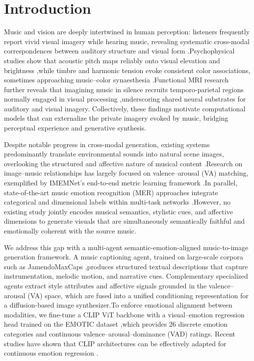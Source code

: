\documentclass[letterpaper]{article}
\begin{document}
\section{Introduction}
Music and vision are deeply intertwined in human perception: listeners frequently report vivid visual imagery while hearing music, revealing systematic cross-modal correspondences between auditory structure and visual form \cite{maimon2020crossmodal}.Psychophysical studies show that acoustic pitch maps reliably onto visual elevation and brightness \cite{takeshima2013changing},while timbre and harmonic tension evoke consistent color associations, sometimes approaching music–color synaesthesia \cite{wallmark2024color}.Functional MRI research further reveals that imagining music in silence recruits temporo-parietal regions normally engaged in visual processing \cite{koelsch2005emotion},underscoring shared neural substrates for auditory and visual imagery. Collectively, these findings motivate computational models that can externalize the private imagery evoked by music, bridging perceptual experience and generative synthesis.

Despite notable progress in cross-modal generation, existing systems predominantly translate environmental sounds into natural scene images, overlooking the structured and affective nature of musical content \cite{lee2023generating}.Research on image–music relationships has largely focused on valence–arousal (VA) matching, exemplified by IMEMNet’s end-to-end metric learning framework \cite{zhao2020emotion,mollahosseini2017affectnet}.In parallel, state-of-the-art music emotion recognition (MER) approaches integrate categorical and dimensional labels within multi-task networks \cite{kang2025unified}.However, no existing study jointly encodes musical semantics, stylistic cues, and affective dimensions to generate visuals that are simultaneously semantically faithful and emotionally coherent with the source music.

We address this gap with a multi-agent semantic-emotion-aligned music-to-image generation framework. A music captioning agent, trained on large-scale corpora such as JamendoMaxCaps \cite{roy2025jamendomaxcaps},produces structured textual descriptions that capture instrumentation, melodic motion, and narrative cues. Complementary specialized agents extract style attributes and affective signals grounded in the valence–arousal (VA) space, which are fused into a unified conditioning representation for a diffusion-based image synthesizer.To enforce emotional alignment between modalities, we fine-tune a CLIP ViT backbone with a visual–emotion regression head trained on the EMOTIC dataset \cite{kosti2017emotic},which provides 26 discrete emotion categories and continuous valence–arousal–dominance (VAD) ratings. Recent studies have shown that CLIP architectures can be effectively adapted for continuous emotion regression \cite{widhoelzl2024decoding}.
\end{document}
